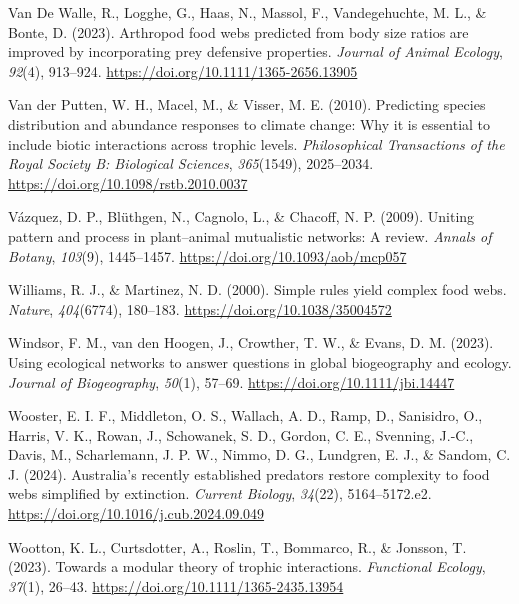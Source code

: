 \documentclass[
]{article}
\newlength{\cslhangindent}
\newenvironment{CSLReferences}[2] %
 {\begin{list}{}{%
  \setlength{\itemindent}{0pt}
  \setlength{\leftmargin}{0pt}
  \setlength{\parsep}{0pt}
  \ifodd #1
   \setlength{\leftmargin}{\cslhangindent}
   \setlength{\itemindent}{-1\cslhangindent}
  \fi
  \setlength{\itemsep}{#2\baselineskip}}}
 {\end{list}}
\begin{document}
\begin{CSLReferences}{1}{0}
Van De Walle, R., Logghe, G., Haas, N., Massol, F., Vandegehuchte, M.
L., \& Bonte, D. (2023). Arthropod food webs predicted from body size
ratios are improved by incorporating prey defensive properties.
\emph{Journal of Animal Ecology}, \emph{92}(4), 913--924.
\url{https://doi.org/10.1111/1365-2656.13905}

Van der Putten, W. H., Macel, M., \& Visser, M. E. (2010). Predicting
species distribution and abundance responses to climate change: Why it
is essential to include biotic interactions across trophic levels.
\emph{Philosophical Transactions of the Royal Society B: Biological
Sciences}, \emph{365}(1549), 2025--2034.
\url{https://doi.org/10.1098/rstb.2010.0037}

Vázquez, D. P., Blüthgen, N., Cagnolo, L., \& Chacoff, N. P. (2009).
Uniting pattern and process in plant--animal mutualistic networks: A
review. \emph{Annals of Botany}, \emph{103}(9), 1445--1457.
\url{https://doi.org/10.1093/aob/mcp057}

Williams, R. J., \& Martinez, N. D. (2000). Simple rules yield complex
food webs. \emph{Nature}, \emph{404}(6774), 180--183.
\url{https://doi.org/10.1038/35004572}

Windsor, F. M., van den Hoogen, J., Crowther, T. W., \& Evans, D. M.
(2023). Using ecological networks to answer questions in global
biogeography and ecology. \emph{Journal of Biogeography}, \emph{50}(1),
57--69. \url{https://doi.org/10.1111/jbi.14447}

Wooster, E. I. F., Middleton, O. S., Wallach, A. D., Ramp, D.,
Sanisidro, O., Harris, V. K., Rowan, J., Schowanek, S. D., Gordon, C.
E., Svenning, J.-C., Davis, M., Scharlemann, J. P. W., Nimmo, D. G.,
Lundgren, E. J., \& Sandom, C. J. (2024). Australia's recently
established predators restore complexity to food webs simplified by
extinction. \emph{Current Biology}, \emph{34}(22), 5164--5172.e2.
\url{https://doi.org/10.1016/j.cub.2024.09.049}

Wootton, K. L., Curtsdotter, A., Roslin, T., Bommarco, R., \& Jonsson,
T. (2023). Towards a modular theory of trophic interactions.
\emph{Functional Ecology}, \emph{37}(1), 26--43.
\url{https://doi.org/10.1111/1365-2435.13954}


\end{CSLReferences}
\end{document}

